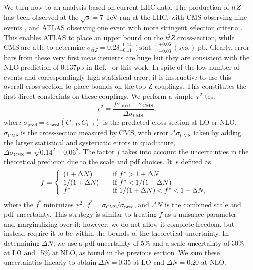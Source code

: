 \documentclass[preprint]{JHEP3} %
\def\ttbZ{t\bar{t}Z}
\begin{document}
We turn now to an analysis based on current LHC data. The production of $\ttbZ$ has been observed at the $\sqrt{s}=7$ TeV run at the LHC, 
with CMS observing nine events \cite{Chatrchyan:2013qca}, and ATLAS observing one event with more stringent selection criteria \cite{ATLAS-CONF-2012-126}. 
This enables ATLAS to place an upper bound on the $\ttbZ$ cross-section, 
while CMS are able to determine $\sigma_{\ttbZ} = 0.28^{+0.14}_{-0.11}~\mathrm{(stat.)}^{+0.06}_{-0.03}~ \mathrm{(sys.)}$ pb. 
Clearly, error bars from these very first measurements are huge but they are consistent with the NLO prediction of 0.137pb in Ref.~\cite{Garzelli:2011is} or this work. 
In spite of the low number of events and correspondingly high statistical error, it is instructive to use this overall cross-section to place bounds on the top-Z couplings. 
This constitutes the first direct constraints on these couplings.
We perform a simple $\chi^2$-test 
\begin{equation}
\chi^2 = \frac{f \sigma_{\mathrm{pred}} - \sigma_{\mathrm{CMS}}}{\Delta \sigma_{\mathrm{CMS}}},
\end{equation}
where $\sigma_{\mathrm{pred}}=\sigma_{\mathrm{pred}}(C_{1,V},C_{1,A})$ is the predicted cross-section at LO or NLO, 
$\sigma_{\mathrm{CMS}}$ is the cross-section measured by CMS, with error $\Delta \sigma_{\mathrm{CMS}}$ taken by adding the larger 
statistical and systematic errors in quadrature, $\Delta \sigma_{\mathrm{CMS}}=\sqrt{0.14^2+0.06^2}$. 
The factor $f$ takes into account the uncertainties in the theoretical predicion due to the scale and pdf choices. 
It is defined as \cite{Baur:2004uw,Baur:2005wi}
 \begin{equation}
f = \left\{ 
\begin{array} {l l}
(1+\Delta N)  & \quad \mathrm{if}~ f^* > 1 + \Delta N \\
1/(1+\Delta N)  & \quad \mathrm{if}~ f^* < 1/(1 + \Delta N) \\
f^* & \quad \mathrm{if}~ 1/(1 + \Delta N) < f^* < 1+\Delta N,
\end{array} \right.\ 
\end{equation}  
where the $f^*$ minimizes $\chi^2$, $f^* = \sigma_{\mathrm{CMS}} / \sigma_{\mathrm{pred}}$, and $\Delta N$ is the combined scale and pdf uncertainty. 
This strategy is similar to treating $f$ as a nuisance parameter and marginalizing over it; however, we do not allow it complete freedom, 
but instead require it to be within the bounds of the theoretical uncertainty. 
In determining $\Delta N$, we use a pdf uncertainty of 5\% and a scale uncertainty of 30\% at LO and 15\% at NLO, as found in the previous section. 
We sum these uncertainties linearly to obtain $\Delta N = 0.35$ at LO and $\Delta N = 0.20$ at NLO. 
\end{document}

